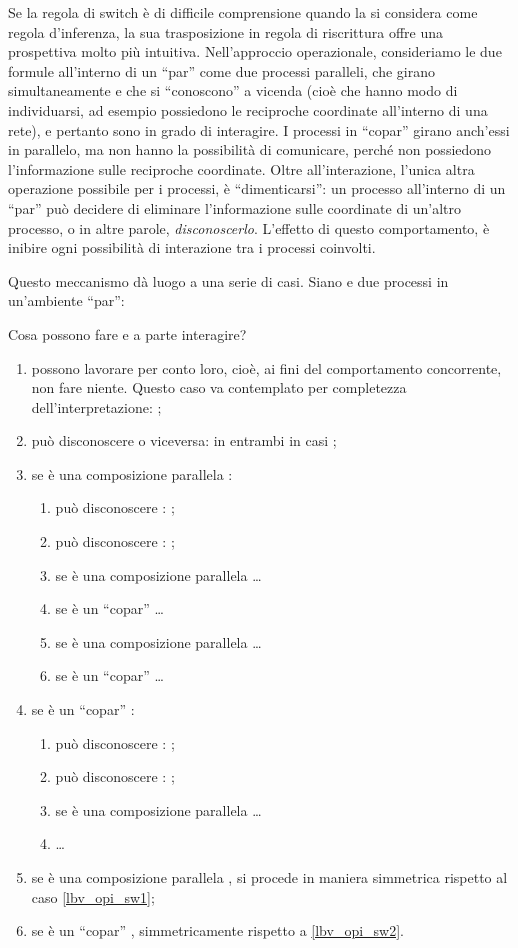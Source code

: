 \documentclass[12pt,a4paper,openright,twoside]{report}
\begin{document}
Se la regola di switch \`e di difficile comprensione quando la si considera come regola d'inferenza, la sua trasposizione in regola di riscrittura offre una prospettiva molto pi\`u intuitiva. Nell'approccio operazionale, consideriamo le due formule all'interno di un ``par'' come due processi paralleli, che girano simultaneamente e che si ``conoscono'' a vicenda (cio\`e che hanno modo di individuarsi, ad esempio possiedono le reciproche coordinate all'interno di una rete), e pertanto sono in grado di interagire. I processi in ``copar'' girano anch'essi in parallelo, ma non hanno la possibilit\`a di comunicare, perch\'e non possiedono l'informazione sulle reciproche coordinate. Oltre all'interazione, l'unica altra operazione possibile per i processi, \`e ``dimenticarsi'': un processo all'interno di un ``par'' pu\`o decidere di eliminare l'informazione sulle coordinate di un'altro processo, o in altre parole, \emph{disconoscerlo}. L'effetto di questo comportamento, \`e inibire ogni possibilit\`a di interazione tra i processi coinvolti.

Questo meccanismo d\`a luogo a una serie di casi. Siano  e  due processi in un'ambiente ``par'':

Cosa possono fare  e  a parte interagire?
\begin{enumerate}[label=\arabic*.]
	\item possono lavorare per conto loro, cio\`e, ai fini del comportamento concorrente, non fare niente. Questo caso va contemplato per completezza dell'interpretazione: ;
	\item  pu\`o disconoscere  o viceversa: in entrambi in casi ;
	\item\label{lbv_opi_sw1} se  \`e una composizione parallela :
	\begin{enumerate}[label=\arabic{enumi}.\arabic*.]
		\item  pu\`o disconoscere : ;
		\item  pu\`o disconoscere : ;
		\item se  \`e una composizione parallela  \ldots
		\item se  \`e un ``copar''  \ldots
		\item se  \`e una composizione parallela  \ldots
		\item se  \`e un ``copar''  \ldots
	\end{enumerate}
	\item\label{lbv_opi_sw2} se  \`e un ``copar'' :
	\begin{enumerate}[label=\arabic{enumi}.\arabic*.]
		\item  pu\`o disconoscere : ;
		\item  pu\`o disconoscere : ;
		\item se  \`e una composizione parallela  \ldots
		\item \ldots
	\end{enumerate}
	\item se  \`e una composizione parallela , si procede in maniera simmetrica rispetto al caso \ref{lbv_opi_sw1};
	\item se  \`e un ``copar'' , simmetricamente rispetto a \ref{lbv_opi_sw2}.
\end{enumerate}
\end{document}
